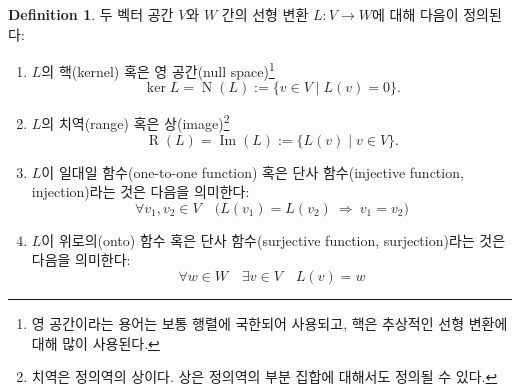 \documentclass[unfonts,oneside,a4paper]{oblivoir}
\theoremstyle{definition}
\newtheorem{definition}{Definition}
\theoremstyle{theorem}
\theoremstyle{remark}
\theoremstyle{remark}
\theoremstyle{remark}
\theoremstyle{remark}
\renewcommand{\vec}[1]{\bm{\mathit{#1}}}
\newcommand{\vecz}{\bm{\mathrm{0}}}
\DeclareMathOperator{\Null}{N}
\DeclareMathOperator{\Image}{Im}
\DeclareMathOperator{\Range}{R}
\begin{document}
\begin{definition}
    두 벡터 공간 $V$와 $W$ 간의 선형 변환 $L: V \rightarrow W$에 대해 다음이 정의된다:
    \begin{enumerate}
        \item $L$의 핵(kernel) 혹은 영 공간(null space)\footnote{영 공간이라는 용어는 보통 행렬에 국한되어 사용되고, 핵은 추상적인 선형 변환에 대해 많이 사용된다.}
            \begin{equation*}
                \ker L = \Null (L) := \{\vec v \in V \mid L(\vec v) = \vecz\}.
            \end{equation*} 
        \item $L$의 치역(range) 혹은 상(image)\footnote{치역은 정의역의 상이다. 상은 정의역의 부분 집합에 대해서도 정의될 수 있다.}
            \begin{equation*}
                \Range (L) = \Image (L) := \{L(\vec v) \mid \vec v \in V\}.
            \end{equation*}
        \item $L$이 일대일 함수(one-to-one function) 혹은 단사 함수(injective function, injection)라는 것은 다음을 의미한다:
            \begin{equation*}
                \forall \vec v_1, \vec v_2 \in V \quad \bigl(L(\vec v_1) = L(\vec v_2)\ \Rightarrow\ \vec v_1 = \vec v_2\bigr)
            \end{equation*}
        \item $L$이 위로의(onto) 함수 혹은 단사 함수(surjective function, surjection)라는 것은 다음을 의미한다:
            \begin{equation*}
                \forall \vec w \in W \quad \exists \vec v \in V \quad L(\vec v) = \vec w
            \end{equation*}
    \end{enumerate}
\end{definition}
\end{document}
